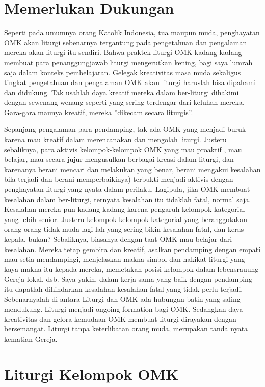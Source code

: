 \section*{Memerlukan Dukungan}

Seperti pada umumnya orang Katolik Indonesia, tua maupun muda, penghayatan OMK akan liturgi sebenarnya tergantung pada pengetahuan dan pengalaman mereka akan liturgi itu sendiri. Bahwa praktek liturgi OMK kadang-kadang membuat para penanggungjawab liturgi mengerutkan kening, bagi saya lumrah saja dalam konteks pembelajaran. Gelegak kreativitas masa muda sekaligus tingkat pengetahuan dan pengalaman OMK akan liturgi haruslah bisa dipahami dan didukung. Tak usahlah daya kreatif mereka dalam ber-liturgi dihakimi dengan sewenang-wenang seperti yang sering terdengar dari keluhan mereka. Gara-gara  maunya kreatif, mereka ”dikecam secara liturgis”.

Sepanjang pengalaman para pendamping, tak ada OMK yang menjadi buruk karena mau kreatif dalam merencanakan dan mengolah liturgi. Justeru sebaliknya, para aktivis kelompok-kelompok OMK yang mau proaktif , mau belajar, mau secara jujur mengusulkan berbagai kreasi dalam liturgi, dan karenanya  berani mencari dan melakukan yang benar, berani mengakui  kesalahan bila terjadi dan berani memperbaikinya) terbukti menjadi aktivis  dengan penghayatan liturgi yang nyata dalam perilaku. Lagipula, jika OMK membuat kesalahan dalam ber-liturgi, ternyata kesalahan itu tidaklah fatal, normal saja. Kesalahan mereka pun kadang-kadang karena pengaruh kelompok kategorial  yang lebih senior. Justeru kelompok-kelompok kategorial yang beranggotakan orang-orang tidak muda lagi lah yang sering bikin kesalahan fatal, dan keras kepala, bukan? Sebaliknya, biasanya dengan taat OMK mau belajar dari kesalahan. Mereka tetap gembira dan kreatif, asalkan pendamping dengan empati mau  setia mendampingi, menjelaskan makna simbol dan hakikat liturgi yang kaya makna itu kepada mereka, memetakan posisi kelompok dalam lebensrauung Gereja lokal, dsb. Saya yakin, dalam kerja sama yang baik dengan pendamping itu dapatlah dihindarkan kesalahan-kesalahan fatal yang tidak perlu terjadi. Sebenarnyalah di antara Liturgi dan OMK ada hubungan batin yang saling mendukung. Liturgi menjadi ongoing formation  bagi OMK. Sedangkan daya kreativitas dan gelora kemudaan OMK membuat liturgi dirayakan dengan bersemangat. Liturgi tanpa keterlibatan orang muda, merupakan tanda nyata kematian Gereja.
\normalsize

\section*{Liturgi Kelompok OMK}

